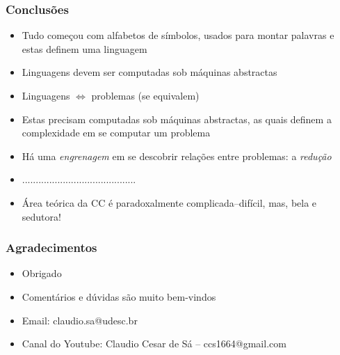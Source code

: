 \documentclass[10pt]{beamer}
\begin{document}

\begin{frame}[fragile]
\frametitle{Conclusões}
\begin{itemize}
    \item Tudo começou com alfabetos de símbolos, usados para  montar palavras e estas definem uma linguagem
    \item Linguagens devem ser computadas sob máquinas abstractas
    \item Linguagens $\Leftrightarrow$ problemas (se equivalem)
    \item Estas precisam computadas sob máquinas abstractas, as quais definem a complexidade em se computar um problema
    \item Há uma \emph{engrenagem} em se descobrir relações entre problemas: a \emph{redução}
    \item ..........................................
    
	\pause
	\item Área teórica da CC  é paradoxalmente  complicada--difícil, mas, bela e  sedutora!
\end{itemize}

\end{frame}

\begin{frame}[fragile]
\frametitle{Agradecimentos}
\begin{itemize}

    \item Obrigado 

	\item Comentários e dúvidas são muito bem-vindos

	\item Email:  claudio.sa@udesc.br 

	\item Canal do Youtube: Claudio Cesar de Sá -- ccs1664@gmail.com
	
\end{itemize}

\end{frame}
\end{document}
